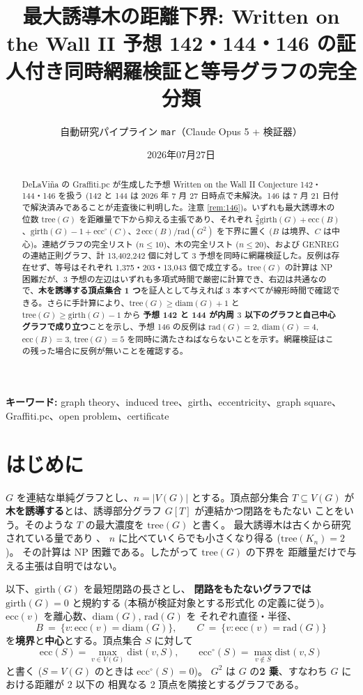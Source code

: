 \documentclass[paper=a4,fontsize=10.5pt,jafontsize=10.5pt]{jlreq}
\title{最大誘導木の距離下界: Written on the Wall II 予想 142・144・146 の証人付き同時網羅検証と等号グラフの完全分類}
\author{自動研究パイプライン \texttt{mar}（Claude Opus 5 + 検証器）}
\date{2026年07月27日}
\theoremstyle{plain}
\theoremstyle{definition}
\begin{document}
\maketitle

\begin{abstract}
DeLaViña の Graffiti.pc が生成した予想 Written on the Wall II Conjecture 142・144・146 を扱う (142 と 144 は 2026 年 7 月 27 日時点で未解決。146 は 7 月 21 日付で解決済みであることが走査後に判明した。注意 \ref{rem:146})。いずれも最大誘導木の位数 $\mathrm{tree}(G)$ を距離量で下から抑える主張であり、それぞれ $\frac{2}{3}\mathrm{girth}(G) + \mathrm{ecc}(B)$、$\mathrm{girth}(G) - 1 + \mathrm{ecc}^{\circ}(C)$、$2\,\mathrm{ecc}(B)/\mathrm{rad}(G^2)$ を下界に置く ($B$ は境界、$C$ は中心)。連結グラフの完全リスト ($n \le 10$)、木の完全リスト ($n \le 20$)、および GENREG の連結正則グラフ、計 13,402,242 個に対して 3 予想を同時に網羅検証した。反例は存在せず、等号はそれぞれ 1,375・203・13,043 個で成立する。$\mathrm{tree}(G)$ の計算は NP 困難だが、3 予想の左辺はいずれも多項式時間で厳密に計算でき、右辺は共通なので、\textbf{木を誘導する頂点集合 1 つ}を証人として与えれば 3 本すべてが線形時間で確認できる。さらに手計算により、$\mathrm{tree}(G) \ge \mathrm{diam}(G)+1$ と $\mathrm{tree}(G) \ge \mathrm{girth}(G)-1$ から \textbf{予想 142 と 144 が内周 $3$ 以下のグラフと自己中心グラフで成り立つ}ことを示し、予想 146 の反例は $\mathrm{rad}(G) = 2$, $\mathrm{diam}(G) = 4$, $\mathrm{ecc}(B) = 3$, $\mathrm{tree}(G) = 5$ を同時に満たさねばならないことを示す。網羅検証はこの残った場合に反例が無いことを確認する。
\end{abstract}

\noindent\textbf{キーワード:} graph theory、induced tree、girth、eccentricity、graph square、Graffiti.pc、open problem、certificate


\section{はじめに}

$G$ を連結な単純グラフとし、$n = |V(G)|$ とする。頂点部分集合 $T \subseteq V(G)$ が
\textbf{木を誘導する}とは、誘導部分グラフ $G[T]$ が連結かつ閉路をもたない
ことをいう。そのような $T$ の最大濃度を $\mathrm{tree}(G)$ と書く。
最大誘導木は古くから研究されている量であり \cite{ess1986}、
$n$ に比べていくらでも小さくなり得る ($\mathrm{tree}(K_n) = 2$)。
その計算は NP 困難である。したがって $\mathrm{tree}(G)$ の下界を
距離量だけで与える主張は自明ではない。

以下、$\mathrm{girth}(G)$ を最短閉路の長さとし、
\textbf{閉路をもたないグラフでは $\mathrm{girth}(G) = 0$} と規約する
(本稿が検証対象とする形式化 \cite{formalconj} の定義に従う)。
$\mathrm{ecc}(v)$ を離心数、$\mathrm{diam}(G)$, $\mathrm{rad}(G)$ を
それぞれ直径・半径、
\[ B \ = \ \{v : \mathrm{ecc}(v) = \mathrm{diam}(G)\}, \qquad
   C \ = \ \{v : \mathrm{ecc}(v) = \mathrm{rad}(G)\} \]
を\textbf{境界}と\textbf{中心}とする。頂点集合 $S$ に対して
\[ \mathrm{ecc}(S) = \max_{v \in V(G)} \mathrm{dist}(v, S), \qquad
   \mathrm{ecc}^{\circ}(S) = \max_{v \notin S} \mathrm{dist}(v, S) \]
と書く ($S = V(G)$ のときは $\mathrm{ecc}^{\circ}(S) = 0$)。
$G^2$ は $G$ の\textbf{2 乗}、すなわち $G$ における距離が $2$ 以下の
相異なる 2 頂点を隣接とするグラフである。
\end{document}
